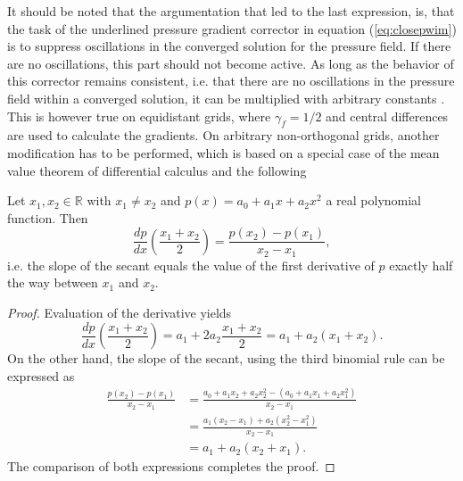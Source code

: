 It should be noted that the argumentation that led to the last expression, is, that the task of the underlined pressure gradient corrector in equation (\ref{eq:closepwim}) is to suppress oscillations in the converged solution for the pressure field. If there are no oscillations, this part should not become active. As long as the behavior of this corrector remains consistent, i.e. that there are no oscillations in the pressure field within a converged solution, it can be multiplied with arbitrary constants \cite{ferziger02}. This is however true on equidistant grids, where \(\gamma_f = 1/2\) and central differences are used to calculate the gradients. On arbitrary non-orthogonal grids, another modification has to be performed, which is based on a special case of the mean value theorem of differential calculus and the following 
\begin{prop}
  Let \(x_1,x_2 \in \mathbb{R}\) with \(x_1 \neq x_2\) and \(p(x) = a_0 + a_1 x + a_2 x^2\) a real polynomial function. Then 
  \begin{displaymath}
    \frac{dp}{dx}\left(\frac{x_1+x_2}{2}\right) = \frac{p(x_2) - p(x_1)}{x_2 - x_1},
  \end{displaymath}
  i.e. the slope of the secant equals the value of the first derivative of \(p\) exactly half the way between \(x_1\) and \(x_2\).
\end{prop}

\begin{proof}
Evaluation of the derivative yields
\begin{displaymath}
    \frac{dp}{dx}\left(\frac{x_1+x_2}{2}\right) = a_1 + 2 a_2 \frac{x_1 + x_2}{2} = a_1 + a_2(x_1 + x_2).
\end{displaymath}
On the other hand, the slope of the secant, using the third binomial rule can be expressed as
\begin{displaymath}
  \begin{array}{ll}
  \frac{p(x_2) - p(x_1)}{x_2 - x_1} 
&= \frac{a_0 + a_1 x_2 + a_2 x_2^2 - \left(a_0 + a_1 x_1 + a_2 x_1 ^2\right)}{x_2 - x_1} \\[1.0em]
  \quad &= \frac{a_1 (x_2 - x_1) + a_2 \left(x_2^2 - x_1^2\right)}{x_2 - x_1} \\[1.0em]
  \quad &= a_1 + a_2 (x_2 + x_1).
\end{array}
\end{displaymath}
The comparison of both expressions completes the proof.
\end{proof}

